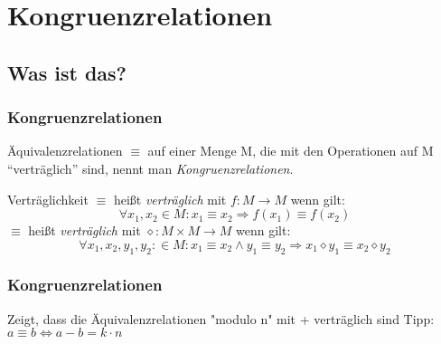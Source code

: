 \section{Kongruenzrelationen}
\subsection{Was ist das?}
\begin{frame}
	\frametitle{Kongruenzrelationen}
	\begin{definition}
		Äquivalenzrelationen $\equiv$ auf einer Menge M, die mit den Operationen auf M "`verträglich"' sind, nennt man \emph{Kongruenzrelationen}.
	\end{definition}
  \begin{block}{Verträglichkeit}
    $\equiv$ heißt \emph{verträglich} mit $f:M\to M$ wenn gilt:
    $$\forall x_1, x_2 \in M: x_1\equiv x_2 \Rightarrow f(x_1)\equiv f(x_2)$$
    $\equiv$ heißt \emph{verträglich} mit $\diamond:M \times M \to M$ wenn gilt:
		$$\forall x_1,x_2,y_1,y_2: \in M: x_1\equiv x_2 \wedge y_1\equiv y_2 \Rightarrow x_1\diamond y_1 \equiv x_2 \diamond y_2$$
	\end{block}
\end{frame}
\begin{frame}
	\frametitle{Kongruenzrelationen}
	\begin{block}{Zeigt, dass die Äquivalenzrelationen "modulo n" mit + verträglich sind}
		Tipp: $a\equiv b \iff a-b = k\cdot n$
	\end{block}
\end{frame}
